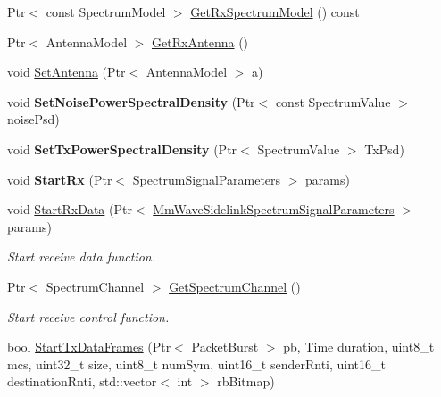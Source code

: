 \begin{DoxyCompactItemize}
\item 
Ptr$<$ const Spectrum\+Model $>$ \hyperlink{classns3_1_1millicar_1_1MmWaveSidelinkSpectrumPhy_adf0968d0659b5790d71a1b41df56c221}{Get\+Rx\+Spectrum\+Model} () const
\item 
Ptr$<$ Antenna\+Model $>$ \hyperlink{classns3_1_1millicar_1_1MmWaveSidelinkSpectrumPhy_a1a7c251de6b22c5afbafcf5937a12082}{Get\+Rx\+Antenna} ()
\item 
void \hyperlink{classns3_1_1millicar_1_1MmWaveSidelinkSpectrumPhy_a3d60ad512ba0df1c26814dad5a241fff}{Set\+Antenna} (Ptr$<$ Antenna\+Model $>$ a)
\item 
\mbox{\label{classns3_1_1millicar_1_1MmWaveSidelinkSpectrumPhy_aab37ea813e418ef5eb11fffee564612a}} 
void {\bfseries Set\+Noise\+Power\+Spectral\+Density} (Ptr$<$ const Spectrum\+Value $>$ noise\+Psd)
\item 
\mbox{\label{classns3_1_1millicar_1_1MmWaveSidelinkSpectrumPhy_aca5b41a007ac964361cf0fec5b194739}} 
void {\bfseries Set\+Tx\+Power\+Spectral\+Density} (Ptr$<$ Spectrum\+Value $>$ Tx\+Psd)
\item 
\mbox{\label{classns3_1_1millicar_1_1MmWaveSidelinkSpectrumPhy_ad37a4e747310a48d149d95f73ed390b1}} 
void {\bfseries Start\+Rx} (Ptr$<$ Spectrum\+Signal\+Parameters $>$ params)
\item 
void \hyperlink{classns3_1_1millicar_1_1MmWaveSidelinkSpectrumPhy_a22f0761f08f5f08dda1de1c778832f5a}{Start\+Rx\+Data} (Ptr$<$ \hyperlink{structns3_1_1millicar_1_1MmWaveSidelinkSpectrumSignalParameters}{Mm\+Wave\+Sidelink\+Spectrum\+Signal\+Parameters} $>$ params)
\begin{DoxyCompactList}\small\item\em Start receive data function. \end{DoxyCompactList}\item 
Ptr$<$ Spectrum\+Channel $>$ \hyperlink{classns3_1_1millicar_1_1MmWaveSidelinkSpectrumPhy_a831e25da1a41abd432e7e412abdb2e90}{Get\+Spectrum\+Channel} ()
\begin{DoxyCompactList}\small\item\em Start receive control function. \end{DoxyCompactList}\item 
bool \hyperlink{classns3_1_1millicar_1_1MmWaveSidelinkSpectrumPhy_ae3703a686eae8ac683c726aeb93cfb6b}{Start\+Tx\+Data\+Frames} (Ptr$<$ Packet\+Burst $>$ pb, Time duration, uint8\+\_\+t mcs, uint32\+\_\+t size, uint8\+\_\+t num\+Sym, uint16\+\_\+t sender\+Rnti, uint16\+\_\+t destination\+Rnti, std\+::vector$<$ int $>$ rb\+Bitmap)

\end{DoxyCompactItemize}
